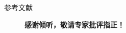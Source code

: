 \documentclass[xcolor=table,mathserif]{beamer}
\begin{document}
\begin{frame}[allowframebreaks]{参考文献}
\nocite{*}

\end{frame}

\begin{frame}
  \begin{figure}[htp]
  \vspace{0.3cm}
  
  \setlength{\parindent}{0pt}
  \huge \textbf{\heiti 感谢倾听，敬请专家批评指正！}
  \end{figure}
\end{frame}
\end{document}
